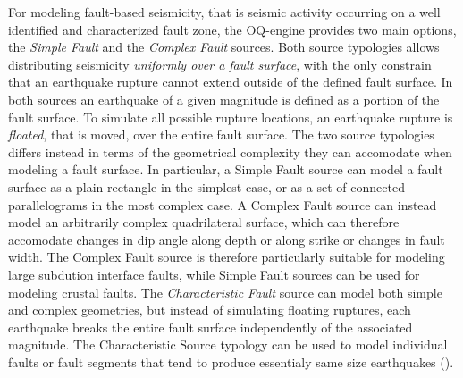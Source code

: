 For modeling fault-based seismicity, that is seismic activity occurring on a well identified and characterized
fault zone, the OQ-engine provides two main options, the \textit{Simple Fault} and the \textit{Complex Fault}
sources. Both source typologies allows distributing seismicity \textit{uniformly over a fault surface}, with the
only constrain that an earthquake rupture cannot extend outside of the defined fault surface. In both sources an earthquake of a given magnitude is defined as a portion of the fault surface. To simulate all possible rupture locations, an earthquake rupture is \textit{floated}, that is moved, over the entire fault surface. The two source typologies differs instead in terms of the geometrical complexity they can accomodate when modeling a fault surface. In particular, a Simple Fault source can model a fault surface as a plain rectangle in the simplest case, or as a set of connected parallelograms in the most complex case. A Complex Fault source can instead model an arbitrarily complex quadrilateral surface, which can therefore accomodate changes in dip angle along depth or along strike or changes in fault width. The Complex Fault source is therefore particularly suitable for modeling large subdution interface faults, while Simple Fault sources can be used for modeling crustal faults. The \textit{Characteristic Fault} source can model both simple and complex geometries, but instead of simulating floating ruptures, each earthquake breaks the entire fault surface independently of the associated magnitude. The Characteristic Source typology can be used to model individual faults or fault segments that tend to produce essentialy same size earthquakes (\cite{schwartscoppersmith1984}).

